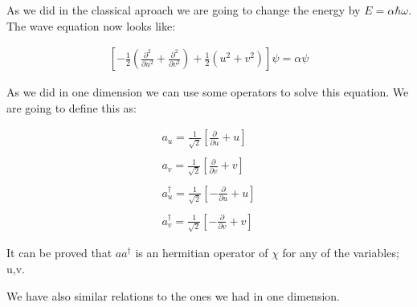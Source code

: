 As we did in the classical aproach we are going to change the energy by $E=\alpha\hbar\omega$. The wave equation now looks like:

\begin{equation}
  \begin{array}{c}
    \left[-\frac{1}{2}\left(\frac{\partial^2}{\partial u^2}+\frac{\partial^2}{\partial v^2}\right)+\frac{1}{2}(u^2+v^2)\right]\psi = \alpha \psi
  \end{array}
\end{equation}

As we did in one dimension we can use some operators to solve this equation. We are going to define this as:

\begin{equation}
  \begin{array}{c}
    a_u = \frac{1}{\sqrt{2}}\left[\frac{\partial}{\partial u}+u\right]
    \\

    \\
    a_v = \frac{1}{\sqrt{2}}\left[\frac{\partial}{\partial v}+v\right]
    \\

    \\
    a_u^{\dagger} = \frac{1}{\sqrt{2}}\left[-\frac{\partial}{\partial u}+u\right]
    \\

    \\
    a_v^{\dagger} = \frac{1}{\sqrt{2}}\left[-\frac{\partial}{\partial v}+v\right]
  \end{array}
\end{equation}

It can be proved that $a a^{\dagger}$ is an hermitian operator of $\chi$ for any of the variables; u,v.

We have also similar relations to the ones we had in one dimension.

